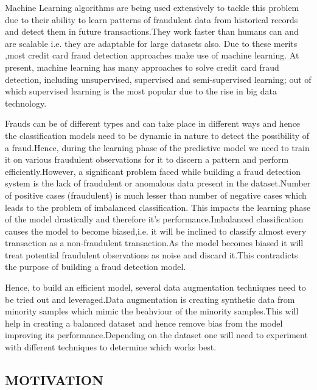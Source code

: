 \documentclass[a4paper, 12pt]{article}
\begin{document}
\par
Machine Learning algorithms are being used extensively to tackle this problem due to their ability to learn patterns of fraudulent data from historical records and detect them in future transactions.They work faster than humans can and are scalable i.e. they are adaptable for large datasets also. Due to these merits ,most credit card fraud detection approaches make use of machine learning. At present, machine learning has many approaches to solve credit card fraud detection, including unsupervised, supervised and semi-supervised learning; out of which supervised learning is the most popular due to the rise in big data technology.
\\

\par 
Frauds can be of different types and can take place in different ways and hence the classification models need to be dynamic in nature to detect the possibility of a fraud.Hence, during the learning phase of the predictive model we need to train it on various fraudulent observations for it to discern a pattern and perform efficiently.However, a significant problem faced while building a fraud detection system is the lack of fraudulent or anomalous data present in the dataset.Number of positive cases (fraudulent) is much lesser than number of negative cases which leads to the problem of imbalanced classification. This impacts the learning phase of the model drastically and therefore it's performance.Imbalanced classification causes the model to become biased,i.e. it will be inclined to classify almost every transaction as a non-fraudulent transaction.As the model becomes biased it will treat potential fraudulent observations as noise and discard it.This contradicts the purpose of building a fraud detection model.
\\

\par 
Hence, to build an efficient model, several data augmentation techniques need to be tried out and leveraged.Data augmentation is creating synthetic data from minority samples which mimic the beahviour of the minority samples.This will help in creating a balanced dataset and hence remove bias from the model improving its performance.Depending on the dataset one will need to experiment with different techniques to determine which works best.
\\




\newpage
\begin{center}

\section{MOTIVATION}

\end{center}
\end{document}
